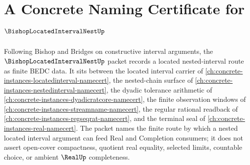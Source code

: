 \chapter{A Concrete Naming Certificate for $\BishopLocatedIntervalNestUp$}
\label{ch:concrete-instances-bishop-located-interval-nest-namecert}

Following Bishop and Bridges on constructive interval arguments, the $\BishopLocatedIntervalNestUp$ packet records a located nested-interval route as finite BEDC data. It sits between the located interval carrier of \autoref{ch:concrete-instances-locatedinterval-namecert}, the nested-chain surface of \autoref{ch:concrete-instances-nestedinterval-namecert}, the dyadic tolerance arithmetic of \autoref{ch:concrete-instances-dyadicratcore-namecert}, the finite observation windows of \autoref{ch:concrete-instances-streamname-namecert}, the regular rational readback of \autoref{ch:concrete-instances-regseqrat-namecert}, and the terminal seal of \autoref{ch:concrete-instances-real-namecert}. The packet names the finite route by which a nested located interval argument can feed Real and Completion consumers; it does not assert open-cover compactness, quotient real equality, selected limits, countable choice, or ambient $\RealUp$ completeness.

